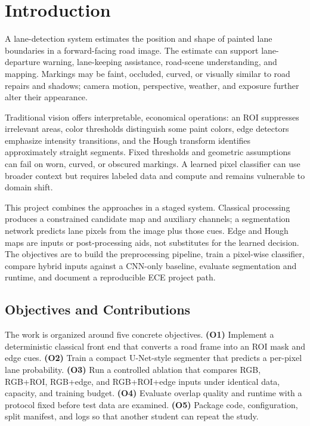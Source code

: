 \documentclass[10pt,a4paper,twocolumn]{article}
\begin{document}
\section{Introduction}
A lane-detection system estimates the position and shape of painted lane boundaries in a forward-facing road image. The estimate can support lane-departure warning, lane-keeping assistance, road-scene understanding, and mapping. Markings may be faint, occluded, curved, or visually similar to road repairs and shadows; camera motion, perspective, weather, and exposure further alter their appearance.

Traditional vision offers interpretable, economical operations: an ROI suppresses irrelevant areas, color thresholds distinguish some paint colors, edge detectors emphasize intensity transitions, and the Hough transform identifies approximately straight segments. Fixed thresholds and geometric assumptions can fail on worn, curved, or obscured markings. A learned pixel classifier can use broader context but requires labeled data and compute and remains vulnerable to domain shift.

This project combines the approaches in a staged system. Classical processing produces a constrained candidate map and auxiliary channels; a segmentation network predicts lane pixels from the image plus those cues. Edge and Hough maps are inputs or post-processing aids, not substitutes for the learned decision. The objectives are to build the preprocessing pipeline, train a pixel-wise classifier, compare hybrid inputs against a CNN-only baseline, evaluate segmentation and runtime, and document a reproducible ECE project path.

\subsection{Objectives and Contributions}
The work is organized around five concrete objectives.
\textbf{(O1)} Implement a deterministic classical front end that converts a road frame into an ROI mask and edge cues.
\textbf{(O2)} Train a compact U-Net-style segmenter that predicts a per-pixel lane probability.
\textbf{(O3)} Run a controlled ablation that compares RGB, RGB+ROI, RGB+edge, and RGB+ROI+edge inputs under identical data, capacity, and training budget.
\textbf{(O4)} Evaluate overlap quality and runtime with a protocol fixed before test data are examined.
\textbf{(O5)} Package code, configuration, split manifest, and logs so that another student can repeat the study.
\end{document}
